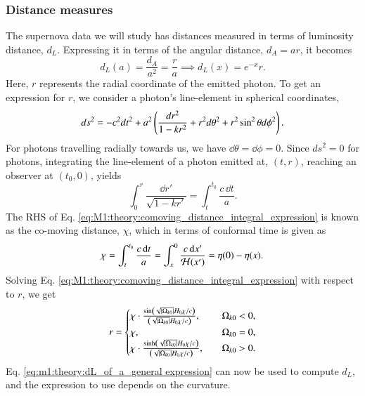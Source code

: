 \subsubsection{Distance measures} 
The supernova data we will study has distances measured in terms of luminosity distance, $d_L$. Expressing it in terms of the angular distance, $d_A=ar$, it becomes 
\begin{equation}
    d_L(a) = \frac{d_A}{a^2} = \frac{r}{a} \implies d_L(x)=e^{-x}r. \label{eq:m1:theory:dL_of_a_general expression}
\end{equation} 
Here, $r$ represents the radial coordinate of the emitted photon. To get an expression for $r$, we consider a photon's line-element in spherical coordinates,
\begin{equation}
    ds^2 = -c^2 dt^2 + a^2 \left( \frac{dr^2}{1-kr^2} + r^2 d\theta^2 + r^2 \sin^2\theta d\phi^2 \right). \label{eq:M1:theory:FLRW_general_nonflat_spherical}
\end{equation} 
For photons travelling radially towards us, we have $\dd \theta=\dd\phi=0$. Since $ds^2=0$ for photons, integrating the line-element of a photon emitted at, $(t,r)$, reaching an observer at $(t_0, 0)$, yields 
\begin{equation}
    \int_0^r \frac{\dd r'}{\sqrt{1-k r'}} = \int_t^{t_0} \frac{c\,\dd t}{a}. \label{eq:M1:theory:comoving_distance_integral_expression}
\end{equation} 
%
The RHS of Eq. \eqref{eq:M1:theory:comoving_distance_integral_expression} is known as the co-moving distance, $\chi$, which in terms of conformal time is given as  
\begin{equation}
    \chi = \int_t^{t_0} \frac{c\,\dd t}{a} = \int_x^0 \frac{c\,\dd x'}{\mathcal{H}(x')} = \eta(0) - \eta(x). \label{eq:M1:theory:chi_eta0_minus_eta_of_x}
\end{equation}
%
Solving Eq. \eqref{eq:M1:theory:comoving_distance_integral_expression} with respect to $r$, we get
\begin{equation}
    r = \begin{cases}
        \chi\cdot \frac{\sin\left( \sqrt{\abs{\Omega_{k0}}} H_0 \chi / c \right)}{\left( \sqrt{\abs{\Omega_{k0}}} H_0 \chi / c \right)},\quad &\Omega_{k0} < 0, \\ 
        \chi,\quad &\Omega_{k0}=0, \\ 
        \chi\cdot \frac{\sinh\left( \sqrt{\abs{\Omega_{k0}}} H_0 \chi / c \right)}{\left( \sqrt{\abs{\Omega_{k0}}} H_0 \chi / c \right)},\quad &\Omega_{k0} > 0.
    \end{cases}
\end{equation} 
Eq. \eqref{eq:m1:theory:dL_of_a_general expression} can now be used to compute $d_L$, and the expression to use depends on the curvature.     



